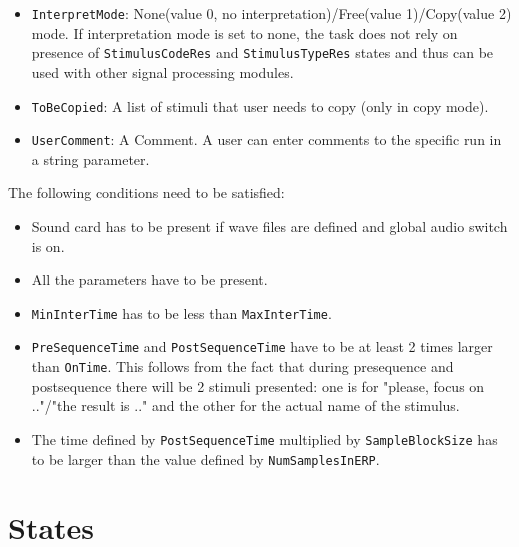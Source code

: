 \documentclass[letterpaper,oneside,12pt]{article}
\begin{document}
\begin{itemize}
 \item {\tt InterpretMode}: None(value 0, no interpretation)/Free(value 1)/Copy(value 2) mode. If interpretation mode is set to none, the task does not rely on presence of 
 {\tt StimulusCodeRes} and {\tt StimulusTypeRes} states and thus can be used with other signal processing modules.
 \item {\tt ToBeCopied}: A list of stimuli that user needs to copy (only in copy mode). 
 \item {\tt UserComment}: A Comment. A user can enter comments to the specific run in a string parameter.
\end{itemize}

The following conditions need to be satisfied: 
\begin{itemize}
  \item Sound card has to be present if wave files are defined and global audio switch is on.
  \item All the parameters have to be present.
  \item {\tt MinInterTime} has to be less than {\tt MaxInterTime}.
  \item {\tt PreSequenceTime} and {\tt PostSequenceTime} have to be at least 2 times larger than {\tt OnTime}. This follows from the fact
  	that during presequence and postsequence there will be 2 stimuli presented: one is for "please, focus on .."/"the result is .." and the
  	other for the actual name of the stimulus.		
  \item The time defined by {\tt PostSequenceTime} multiplied by {\tt SampleBlockSize} has to be larger than the value defined by {\tt NumSamplesInERP}.
\end{itemize}



\section{States}
\end{document}
